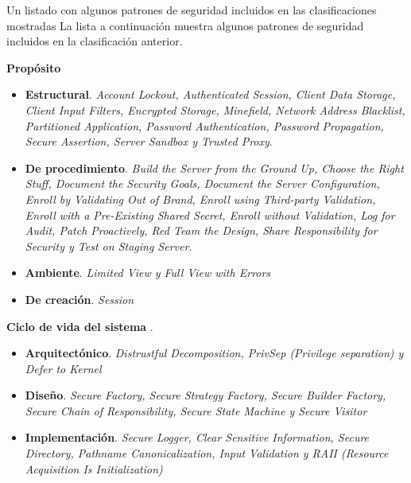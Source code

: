 \vspace{0.3cm}

Un listado con algunos patrones de seguridad incluidos en las clasificaciones mostradas
La lista a continuación muestra algunos patrones de seguridad incluidos en la clasificación anterior.

\vspace{0.3cm}

\textbf{Propósito} \cite{KonCamWas03,KieEldTyr06}

\begin{itemize}[noitemsep]
	\item \textbf{Estructural}. \textit{Account Lockout, Authenticated Session, Client Data Storage, Client Input Filters, Encrypted Storage, Minefield, Network Address Blacklist, Partitioned Application, Password Authentication, Password Propagation, Secure Assertion, Server Sandbox y Trusted Proxy}.
	\item \textbf{De procedimiento}. \textit{Build the Server from the Ground Up, Choose the Right Stuff, Document the Security Goals, Document the Server Configuration, Enroll by Validating Out of Brand, Enroll using Third-party Validation, Enroll with a Pre-Existing Shared Secret, Enroll without Validation, Log for Audit, Patch Proactively, Red Team the Design, Share Responsibility for Security y Test on Staging Server}.
	\item \textbf{Ambiente}. \textit{Limited View y Full View with Errors}	
	\item \textbf{De creación}. \textit{Session}
\end{itemize}

\vspace{0.3cm}

\textbf{Ciclo de vida del sistema} \cite{MelJen08}.

\begin{itemize}[noitemsep]
	\item \textbf{Arquitectónico}. \textit{Distrustful Decomposition, PrivSep (Privilege separation) y Defer to Kernel}
	\item \textbf{Diseño}. \textit{Secure Factory, Secure Strategy Factory, Secure Builder Factory, Secure Chain of Responsibility, Secure State Machine y Secure Visitor}
	\item \textbf{Implementación}. \textit{Secure Logger, Clear Sensitive Information, Secure Directory, Pathname Canonicalization, Input Validation y RAII (Resource Acquisition Is Initialization)}
\end{itemize}

